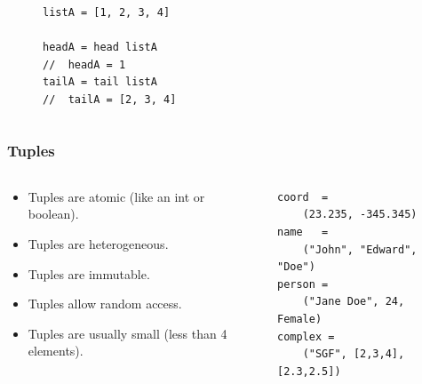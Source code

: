\documentclass{beamer}
\begin{document}
\begin{frame}[fragile=singleslide]
\begin{columns}[c]
\begin{column}[T]{5cm}
\begin{figure}
{
                    }
                \end{figure}
                \begin{figure}
                    \begin{lstlisting}
listA = [1, 2, 3, 4]

headA = head listA
//  headA = 1
tailA = tail listA
//  tailA = [2, 3, 4]
                    \end{lstlisting}
                \end{figure}
            \end{column}
        \end{columns}
    \end{frame}

    \begin{frame}[fragile=singleslide]
        \frametitle{Tuples}

        \begin{columns}[c]
            \begin{column}[T]{5cm}
                \begin{itemize}
                    \item Tuples are atomic (like an int or boolean).
                    \item Tuples are heterogeneous.
                    \item Tuples are immutable.
                    \item Tuples allow random access.
                    \item Tuples are usually small (less than 4 elements).
                \end{itemize}
            \end{column}
            \begin{column}[T]{5cm}
                \begin{lstlisting}
coord  = 
    (23.235, -345.345)
name   = 
    ("John", "Edward", "Doe")
person = 
    ("Jane Doe", 24, Female)
complex =
    ("SGF", [2,3,4], [2.3,2.5])
                \end{lstlisting}
            \end{column}
        \end{columns}
    \end{frame}
\end{document}
